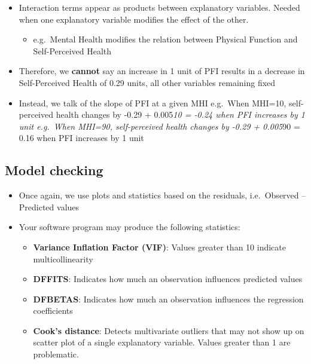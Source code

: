 \documentclass[
]{book}
\providecommand{\tightlist}{%
  \setlength{\itemsep}{0pt}\setlength{\parskip}{0pt}}
\begin{document}
\begin{itemize}
\tightlist
\item
  Interaction terms appear as products between explanatory variables. Needed when one explanatory variable modifies the effect of the other.

  \begin{itemize}
  \tightlist
  \item
    e.g.~Mental Health modifies the relation between Physical Function and Self-Perceived Health
  \end{itemize}
\item
  Therefore, we \textbf{cannot} say an increase in 1 unit of PFI results in a decrease in Self-Perceived Health of 0.29 units, all other variables remaining fixed
\item
  Instead, we talk of the slope of PFI at a given MHI
  e.g.~When MHI=10, self-perceived health changes by -0.29 + 0.005\emph{10 = -0.24 when PFI increases by 1 unit
  e.g.~When MHI=90, self-perceived health changes by -0.29 + 0.005}90 = 0.16 when PFI increases by 1 unit
\end{itemize}

\hypertarget{model-checking}{%
\subsection{Model checking}\label{model-checking}}

\begin{itemize}
\tightlist
\item
  Once again, we use plots and statistics based on the residuals, i.e.~Observed -- Predicted values
\item
  Your software program may produce the following statistics:

  \begin{itemize}
  \tightlist
  \item
    \textbf{Variance Inflation Factor (VIF)}: Values greater than 10 indicate multicollinearity
  \item
    \textbf{DFFITS}: Indicates how much an observation influences predicted values
  \item
    \textbf{DFBETAS}: Indicates how much an observation influences the regression coefficients
  \item
    \textbf{Cook's distance}: Detects multivariate outliers that may not show up on scatter plot of a single explanatory variable. Values greater than 1 are problematic.
  \end{itemize}
\end{itemize}
\end{document}
